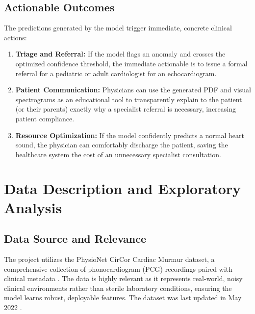 \documentclass[11pt, a4paper]{article}
\begin{document}
\subsection{Actionable Outcomes}
The predictions generated by the model trigger immediate, concrete clinical actions:
\begin{enumerate}
    \item \textbf{Triage and Referral:} If the model flags an anomaly and crosses the optimized confidence threshold, the immediate actionable is to issue a formal referral for a pediatric or adult cardiologist for an echocardiogram.
    \item \textbf{Patient Communication:} Physicians can use the generated PDF and visual spectrograms as an educational tool to transparently explain to the patient (or their parents) exactly why a specialist referral is necessary, increasing patient compliance.
    \item \textbf{Resource Optimization:} If the model confidently predicts a normal heart sound, the physician can comfortably discharge the patient, saving the healthcare system the cost of an unnecessary specialist consultation.
\end{enumerate}

\section{Data Description and Exploratory Analysis}
\subsection{Data Source and Relevance}
The project utilizes the PhysioNet CirCor Cardiac Murmur dataset, a comprehensive collection of phonocardiogram (PCG) recordings paired with clinical metadata \cite{reyna2022heart}. The data is highly relevant as it represents real-world, noisy clinical environments rather than sterile laboratory conditions, ensuring the model learns robust, deployable features.
The dataset was last updated in May 2022 \cite{physionet2022}.
\end{document}
